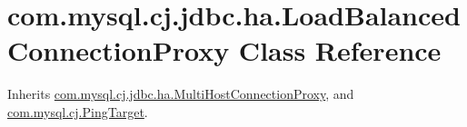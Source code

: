 \hypertarget{classcom_1_1mysql_1_1cj_1_1jdbc_1_1ha_1_1_load_balanced_connection_proxy}{}\section{com.\+mysql.\+cj.\+jdbc.\+ha.\+Load\+Balanced\+Connection\+Proxy Class Reference}
\label{classcom_1_1mysql_1_1cj_1_1jdbc_1_1ha_1_1_load_balanced_connection_proxy}


Inherits \mbox{\hyperlink{classcom_1_1mysql_1_1cj_1_1jdbc_1_1ha_1_1_multi_host_connection_proxy}{com.\+mysql.\+cj.\+jdbc.\+ha.\+Multi\+Host\+Connection\+Proxy}}, and \mbox{\hyperlink{interfacecom_1_1mysql_1_1cj_1_1_ping_target}{com.\+mysql.\+cj.\+Ping\+Target}}.

